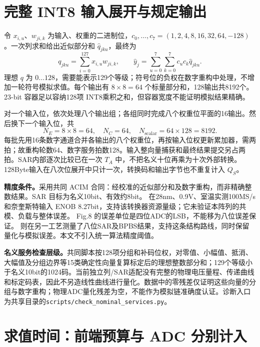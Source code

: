 \section{完整 INT8 输入展开与规定输出}

令 $x_{i,u}$、$w_{ji,k}$ 为输入、权重的二进制位，$c_0,\ldots,c_7=(1,2,4,8,16,32,64,-128)$。一次列求和给出近似部分和 $\hat q_{jku}$，最终为
\begin{equation}
q_{jku}=\sum_{i=0}^{127}x_{i,u}w_{ji,k},\qquad
\hat y_j=\sum_{u=0}^{7}\sum_{k=0}^{7}c_uc_k\hat q_{jku}.
\label{01_sram_acim:eq:reconstruction}
\end{equation}
理想 $q$ 为 $0\ldots128$，需要能表示129个等级；符号位的负权在数字重构中处理，不增加一轮符号模拟求值。每个输出有 $8\times8=64$ 个标量部分和，128输出共8192个。23-bit 容器足以容纳128项 INT8乘积之和，但容器宽度不能证明模拟结果精确。

对一个输入位，依次处理八个输出组；各组同时完成八个权重位平面的16输出。然后换下一个输入位，共
\[
N_E=8\times8=64,\quad N_C=64,\quad
N_{\mathrm{scalar}}=64\times128=8192.
\]
每批先用16条数字通道合并各输出的八个权重位，再按输入位权更新累加器，需两拍；故重构轮数64、数字服务拍数128。输入整向量捕获和最终结果提交另占两拍。SAR内部逐次比较已在一次 $T_A$ 中，不把名义十位再乘为十次外部转换。128Byte输入在八次位展开中只计一次，转换码和输出字节也不重复计入 $Q_S$。

\textbf{精度条件。}采用共同 ACIM 合同：经校准的近似部分和及数字重构，而非精确整数结果。SAR 目标为名义10bit、有效约8bit。 在28nm、0.9V、室温实测100MS/s和奈奎斯特输入 ENOB 8.27bit，支持该转换器资源量级；它未验证本阵列的共模、负载与整体误差。 Fig.8 的误差单位是四位ADC的LSB，不能移为八位误差保证。 则在另一工艺测量了八位SAR及BPBS结果，支持这条结构路线，同时保留量化与模拟误差。本文不引入统一算法精度阈值。

\textbf{名义服务检查层级。}共同脚本按128项分组和补码位权，对零值、小幅值、抵消、大幅值及分组边界等15类确定性向量复算标定后的理想整数部分和；129个等级小于名义10bit的1024码。当前独立列/SAR适配没有完整的物理电压量程、传递曲线和标定码表，因此不另造线性曲线进行量化。数据中的零残差仅证明这些向量的分组与数字重构；物理ADC量化残差为空，不能作为模拟链准确度认证。诊断入口为共享目录的\texttt{scripts/check\_nominal\_services.py}。\par

\section{求值时间：前端预算与 ADC 分别计入}

